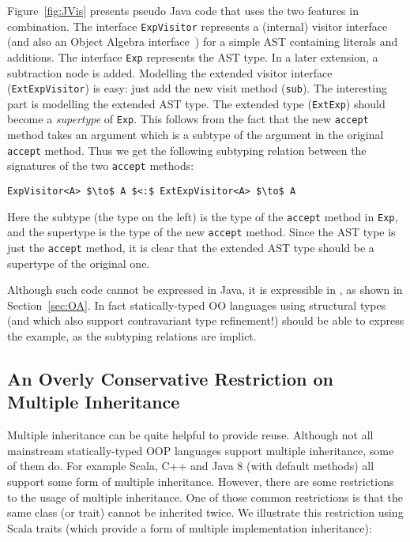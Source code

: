 Figure~\ref{fig:JVis} presents pseudo Java code that uses the two features in
combination. The interface \lstinline{ExpVisitor} represents a (internal)
visitor interface (and also an Object Algebra
interface~\cite{oliveira2012extensibility}) for a simple AST containing literals
and additions. The interface \lstinline{Exp} represents the AST type. In a
later extension, a subtraction node is added. Modelling the extended visitor
interface (\lstinline{ExtExpVisitor}) is easy: just add the new visit method
(\lstinline{sub}). The interesting part is modelling the extended AST type. The
extended type (\lstinline{ExtExp}) should become a \emph{supertype} of
\lstinline{Exp}. This follows from the fact that the new \lstinline{accept}
method takes an argument which is a subtype of the argument in the original \lstinline{accept}
method. Thus we get the following subtyping relation between the signatures of
the two \lstinline{accept} methods:

\begin{lstlisting}[mathescape=true]
ExpVisitor<A> $\to$ A $<:$ ExtExpVisitor<A> $\to$ A
\end{lstlisting}

\noindent Here the subtype (the type on the left) is the type of the
\lstinline{accept} method in \lstinline{Exp}, and the supertype is the type of
the new \lstinline{accept} method. Since the AST type is just the
\lstinline{accept} method, it is clear that the extended AST type should be a
supertype of the original one. 

Although such code cannot be expressed in Java, it is expressible in
\name, as shown in Section~\ref{sec:OA}. In fact statically-typed
OO languages using structural types (and which also support
contravariant type refinement!) should be able to express 
the example, as the subtyping relations are implict. 

\subsection{An Overly Conservative Restriction on Multiple Inheritance}

Multiple inheritance can be quite helpful to provide reuse. Although not all
mainstream statically-typed OOP languages support multiple inheritance, some of
them do. For example Scala, C++ and Java 8 (with default methods) all support
some form of multiple inheritance. However, there are some restrictions to the
usage of multiple inheritance. One of those common restrictions is that the same
class (or trait) cannot be inherited twice. We illustrate this restriction using
Scala traits (which provide a form of multiple implementation inheritance):

